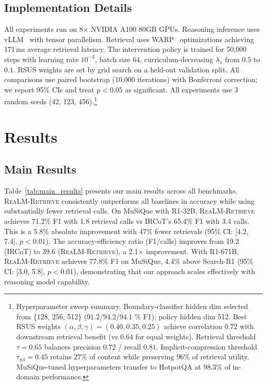 \documentclass[sigconf,natbib=true]{acmart}
\newcommand{\methodname}{\textsc{ReaLM-Retrieve}}
\begin{document}
\subsection{Implementation Details}
All experiments run on 8$\times$ NVIDIA A100 80GB GPUs. Reasoning inference uses vLLM~\cite{kwon2023vllm} with tensor parallelism. Retrieval uses WARP~\cite{scheerer2025warp} optimizations achieving 171\,ms average retrieval latency. The intervention policy is trained for 50,000 steps with learning rate $10^{-4}$, batch size 64, curriculum-decreasing $\lambda_1$ from $0.5$ to $0.1$. RSUS weights are set by grid search on a held-out validation split. All comparisons use paired bootstrap (10,000 iterations) with Bonferroni correction; we report 95\% CIs and treat $p<0.05$ as significant. All experiments use 3 random seeds (42, 123, 456).\footnote{Hyperparameter sweep summary. Boundary-classifier hidden dim selected from \{128, 256, 512\} ($91.2/94.2/94.1$ \% F1); policy hidden dim 512. Best RSUS weights $(\alpha,\beta,\gamma)=(0.40, 0.35, 0.25)$ achieve correlation $0.72$ with downstream retrieval benefit (vs $0.64$ for equal weights). Retrieval threshold $\tau=0.65$ balances precision $0.72$ / recall $0.81$. Implicit-compression threshold $\tau_{\text{rel}}=0.45$ retains 27\% of content while preserving 96\% of retrieval utility. MuSiQue-tuned hyperparameters transfer to HotpotQA at 98.3\% of in-domain performance.}

\section{Results}
\label{sec:results}

\subsection{Main Results}
Table~\ref{tab:main_results} presents our main results across all benchmarks. \methodname{} consistently outperforms all baselines in accuracy while using substantially fewer retrieval calls. On MuSiQue with R1-32B, \methodname{} achieves 71.2\% F1 with 1.8 retrieval calls vs IRCoT's 65.4\% F1 with 3.4 calls. This is a 5.8\% absolute improvement with 47\% fewer retrievals (95\% CI: [4.2, 7.4], $p<0.01$). The accuracy-efficiency ratio (F1/calls) improves from 19.2 (IRCoT) to 39.6 (\methodname{}), a 2.1$\times$ improvement. With R1-671B, \methodname{} achieves 77.8\% F1 on MuSiQue, 4.4\% above Search-R1 (95\% CI: [3.0, 5.8], $p<0.01$), demonstrating that our approach scales effectively with reasoning model capability.
\end{document}
